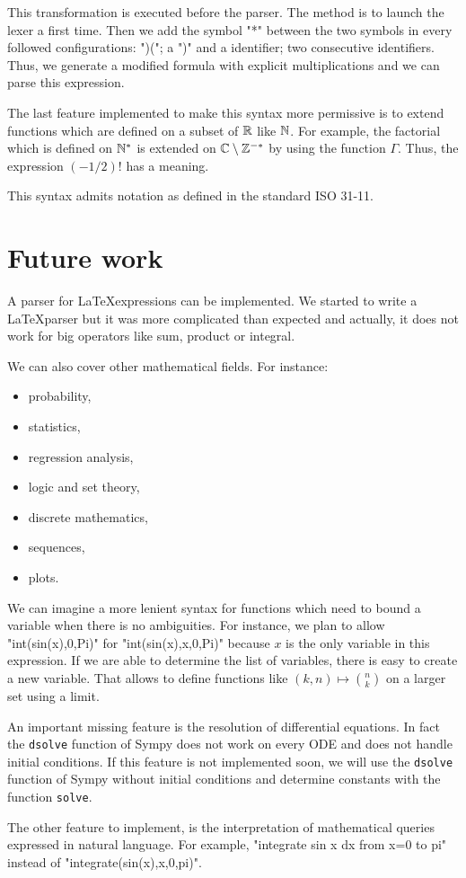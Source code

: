 This transformation is executed before the parser. The method is to launch the lexer a first time. Then we add the symbol "*" between the two symbols in every followed configurations: ")("; a ")" and a identifier; two consecutive identifiers. Thus, we generate a modified formula with explicit multiplications and we can parse this expression.

The last feature implemented to make this syntax more permissive is to extend functions which are defined on a subset of $\mathbb{R}$ like $\mathbb{N}$. For example, the factorial which is defined on $\mathbb{N}^*$ is extended on $\mathbb{C}\setminus \mathbb{Z}^{-*}$ by using the function $\Gamma$. Thus, the expression $(-1/2)!$ has a meaning.

This syntax admits notation as defined in the standard ISO 31-11.

\section{Future work}

A parser for \LaTeX expressions can be implemented. We started to write a \LaTeX parser but it was more complicated than expected and actually, it does not work for big operators like sum, product or integral.

We can also cover other mathematical fields. For instance:
\begin{itemize}
    \item probability,
    \item statistics,
    \item regression analysis,
    \item logic and set theory,
    \item discrete mathematics,
    \item sequences,
    \item plots.
\end{itemize}

We can imagine a more lenient syntax for functions which need to bound a variable when there is no ambiguities. For instance, we plan to allow "int(sin(x),0,Pi)" for "int(sin(x),x,0,Pi)" because $x$ is the only variable in this expression. If we are able to determine the list of variables, there is easy to create a new variable. That allows to define functions like $(k,n)\mapsto \binom{n}{k}$ on a larger set using a limit.

An important missing feature is the resolution of differential equations. In fact the \texttt{dsolve} function of Sympy does not work on every ODE and does not handle initial conditions. If this feature is not implemented soon, we will use the \texttt{dsolve} function of Sympy without initial conditions and determine constants with the function \texttt{solve}.

The other feature to implement, is the interpretation of mathematical queries expressed in natural language. For example, "integrate sin x dx from x=0 to pi" instead of "integrate(sin(x),x,0,pi)".